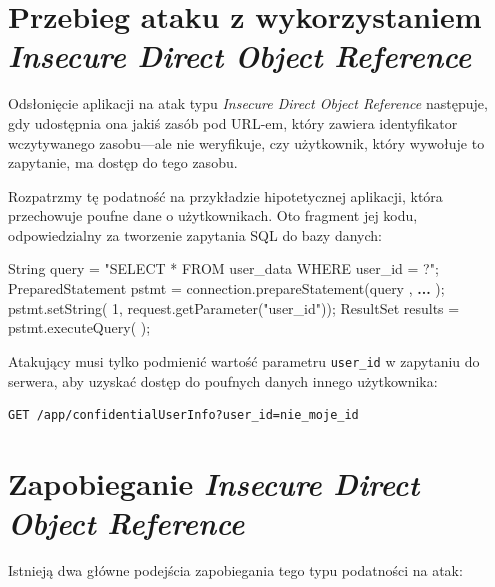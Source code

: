 \documentclass[12pt,polish,a4paper,]{report}
\newenvironment{Shaded}{}{}
\newcommand{\KeywordTok}[1]{\textcolor[rgb]{0.00,0.44,0.13}{\textbf{{#1}}}}
\newcommand{\DecValTok}[1]{\textcolor[rgb]{0.25,0.63,0.44}{{#1}}}
\newcommand{\StringTok}[1]{\textcolor[rgb]{0.25,0.44,0.63}{{#1}}}
\newcommand{\FunctionTok}[1]{\textcolor[rgb]{0.02,0.16,0.49}{{#1}}}
\newcommand{\NormalTok}[1]{{#1}}
\begin{document}
\section{\texorpdfstring{Przebieg ataku z wykorzystaniem \emph{Insecure
Direct Object
Reference}}{Przebieg ataku z wykorzystaniem Insecure Direct Object Reference}}\label{przebieg-ataku-z-wykorzystaniem-insecure-direct-object-reference}

Odsłonięcie aplikacji na atak typu \emph{Insecure Direct Object
Reference} następuje, gdy udostępnia ona jakiś zasób pod URL-em, który
zawiera identyfikator wczytywanego zasobu---ale nie weryfikuje, czy
użytkownik, który wywołuje to zapytanie, ma dostęp do tego zasobu.

Rozpatrzmy tę podatność na przykładzie hipotetycznej aplikacji, która
przechowuje poufne dane o użytkownikach. Oto fragment jej kodu,
odpowiedzialny za tworzenie zapytania SQL do bazy danych:

\begin{Shaded}
\begin{Highlighting}[]
\NormalTok{String query = }\StringTok{"SELECT * FROM user_data WHERE user_id = ?"}\NormalTok{;}
\NormalTok{PreparedStatement pstmt =}
    \NormalTok{connection.}\FunctionTok{prepareStatement}\NormalTok{(query , }\KeywordTok{... }\NormalTok{);}
\NormalTok{pstmt.}\FunctionTok{setString}\NormalTok{( }\DecValTok{1}\NormalTok{, request.}\FunctionTok{getParameter}\NormalTok{(}\StringTok{"user_id"}\NormalTok{));}
\NormalTok{ResultSet results = pstmt.}\FunctionTok{executeQuery}\NormalTok{( );}
\end{Highlighting}
\end{Shaded}

Atakujący musi tylko podmienić wartość parametru \texttt{user\_id} w
zapytaniu do serwera, aby uzyskać dostęp do poufnych danych innego
użytkownika:

\begin{verbatim}
GET /app/confidentialUserInfo?user_id=nie_moje_id
\end{verbatim}

\section{\texorpdfstring{Zapobieganie \emph{Insecure Direct Object
Reference}}{Zapobieganie Insecure Direct Object Reference}}\label{zapobieganie-insecure-direct-object-reference}

Istnieją dwa główne podejścia zapobiegania tego typu podatności na atak:
\end{document}
